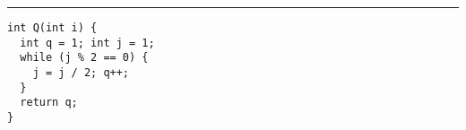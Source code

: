 \documentclass{article}
\begin{document}
\lstset{language = C,
    extendedchars = \true,
    keepspaces = true,
    breaklines=true,
    frame=lines}
\hrule
\begin{lstlisting}[title=\textbf {Алгоритм 1.3} Функция Q определения номера изменяемого разряда]
int Q(int i) {
  int q = 1; int j = 1;
  while (j % 2 == 0) {
    j = j / 2; q++;
  }
  return q;
}

\end{lstlisting}
\end{document}
